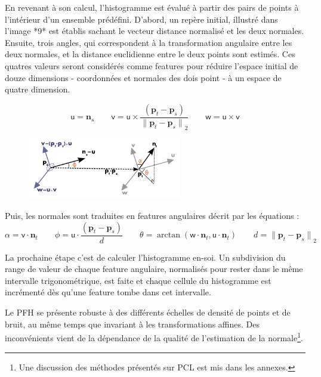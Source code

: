 En revenant à son calcul, l'histogramme est évalué à partir des pairs
de points à l'intérieur d’un ensemble prédéfini. D'abord, un repère
initial, illustré dans l'image *9* est établis sachant le vecteur distance normalisé et les deux
normales. Ensuite, trois angles, qui correspondent à la transformation
angulaire entre les deux normales, et la distance euclidienne entre le
deux points sont estimés. Ces quatres valeurs seront considérés comme
features pour réduire l’espace initial de douze dimensions - coordonnées
et normales des dois point - à un espace de quatre dimension.


\begin{equation*}
  {\mathsf u} = \boldsymbol{n}_s \qquad
  {\mathsf v} =  {\mathsf u} \times \frac{(\boldsymbol{p}_t-\boldsymbol{p}_s)}{{\|\boldsymbol{p}_t-\boldsymbol{p}_s\|}_{2}}  \qquad
 {\mathsf w} = {\mathsf u} \times {\mathsf v}
\end{equation*}

\begin{figure}[H]
\centering
\includegraphics[width=0.6\textwidth]{pfh_frame.png}
\end{figure}


Puis, les normales sont traduites en features angulaires décrit par les équations :
\begin{equation*}
  \alpha = {\mathsf v} \cdot \boldsymbol{n}_t  \qquad
  \phi   = {\mathsf u} \cdot \frac{(\boldsymbol{p}_t - \boldsymbol{p}_s)}{d} \qquad
  \theta = \arctan ({\mathsf w} \cdot \boldsymbol{n}_t, {\mathsf u} \cdot \boldsymbol{n}_t) \qquad
  d={\|\boldsymbol{p}_t-\boldsymbol{p}_s\|}_2 
\end{equation*}

La prochaine étape c'est de calculer l'histogramme en-soi. Un
subdivision du range de valeur de chaque feature angulaire, 
normalisés pour rester dans le même intervalle trigonométrique,
est faite et chaque cellule du histogramme est incrémenté dès
qu'une feature tombe dans cet intervalle. 

Le PFH se présente robuste à des différents échelles de densité de points et de bruit, au même temps que invariant à les transformations affines. Des inconvénients vient de la dépendance de la qualité de l'estimation de la normale\footnote{ Une discussion des méthodes présentés sur PCL est mis dans les annexes.}.

